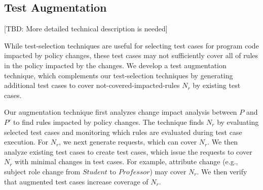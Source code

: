 \subsection{Test Augmentation}
[TBD: More detailed technical description is needed]

While test-selection techniques are useful for selecting test cases for program code impacted by policy changes, these test cases may not sufficiently cover all of rules in the policy impacted by the changes.
We develop a test augmentation technique, which complements our test-selection techniques by generating additional test cases to 
cover not-covered-impacted-rules $N_r$ by existing test cases.

Our augmentation technique first analyzes change impact analysis between $P$ and $P'$ to find rules impacted by policy changes.
The technique finds $N_r$ by evaluating selected test cases and monitoring which 
rules are evaluated during test case execution.
For $N_r$, we next generate requests, which can cover $N_r$.
We then analyze existing test cases to create test cases, which issue the requests
to cover $N_r$ with minimal changes in test cases.
For example, attribute change (e.g., subject role change from $Student$ to $Professor$) may cover $N_r$. We then verify that augmented test cases increase coverage of $N_r$.








